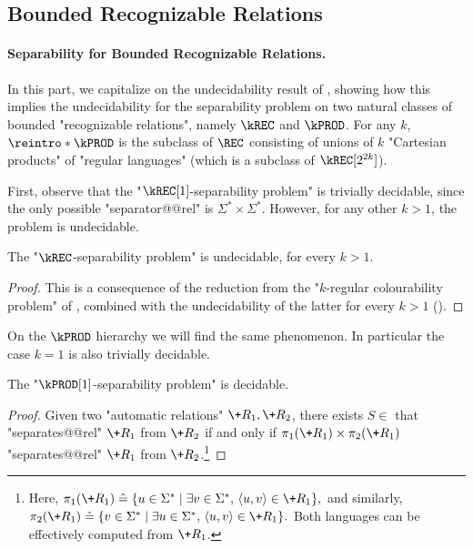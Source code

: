 \subsection{Bounded Recognizable Relations}
\AP\label{sec:dichotomy-bounded}

\paragraph*{Separability for Bounded Recognizable Relations.}

In this part, we capitalize on the undecidability result of , showing how this implies the undecidability for the separability problem on two natural classes of bounded "recognizable relations", namely $\kREC$ and $\kPROD$.
For any $k$, $\reintro*\kPROD$ is the subclass of $\REC$ consisting of unions of $k$ "Cartesian products" of "regular languages" (which is a subclass of $\kREC[2^{2k}]$).

First, observe that the "$\kREC[1]$-separability problem" is trivially decidable, since the only possible "separator@@rel" is $\Sigma^* \times \Sigma^*$. However, for any other $k>1$, the problem is undecidable.

\begin{corollary}
    \label{coro:krec-sep-undec}
    The "$\kREC$-separability problem" is undecidable, for every $k>1$.
\end{corollary}

\begin{proof}
    This is a consequence of the reduction from the "$k$-regular colourability problem" of , combined with the undecidability of the latter for every $k>1$ ().
\end{proof}

On the $\kPROD$ hierarchy we will find the same phenomenon. In particular the case $k=1$ is also trivially decidable.

\begin{proposition}
    The "$\kPROD[1]$-separability problem" is decidable.
\end{proposition}
\begin{proof}
    Given two "automatic relations" $\+R_1, \+R_2$, there exists $S \in $ \kPROD[1]
    that "separates@@rel" $\+R_1$ from $\+R_2$ if and only if $\pi_1(\+R_1)\times \pi_2(\+R_1)$
    "separates@@rel" $\+R_1$ from $\+R_2$.\footnote{Here,
    \(
        \pi_1(\+R_1) \defeq 
        \{u \in \Sigma^* \mid \exists v\in \Sigma^*,\,\tup{u,v} \in \+R_1\},
    \)
    and similarly,
    \(
        \pi_2(\+R_1) \defeq 
        \{v \in \Sigma^* \mid \exists u\in \Sigma^*,\,\tup{u,v} \in \+R_1\}.
    \)
    Both languages can be effectively computed from $\+R_1$.}
\end{proof}

